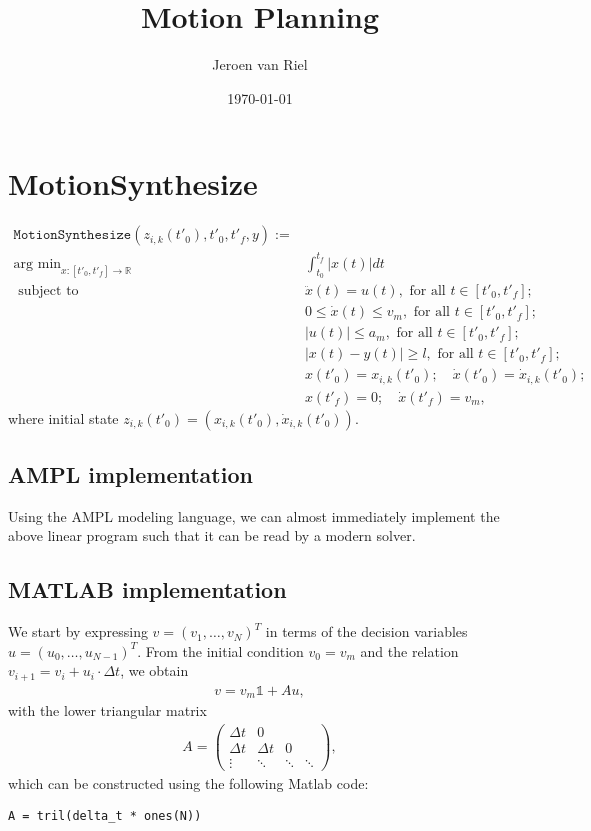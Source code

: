 \documentclass[a4paper]{article}
\author{Jeroen van Riel}
\date{\monthyeardate\today}
\title{Motion Planning}
\theoremstyle{definition}
\theoremstyle{plain}
\begin{document}
\section*{MotionSynthesize}

\begin{align*}
  \texttt{MotionSynthesize}(z_{i,k}(t'_{0}), t'_{0}, t'_{f}, y) := \\
  \text{arg min}_{x : [t'_{0}, t'_{f}] \rightarrow \mathbb{R}} \; &\int_{t_{0}}^{t_{f}} |x(t)|dt \\
  \text{ subject to } \; & \ddot{x}(t) = u(t) , \text{ for all } t \in [t'_{0}, t'_{f}] ; \\
  & 0 \leq \dot{x}(t) \leq v_{m} , \text{ for all } t \in [t'_{0}, t'_{f}] ; \\
  & |u(t)| \leq a_{m} , \text{ for all } t \in [t'_{0}, t'_{f}] ; \\
  & |x(t) - y(t)| \geq l , \text{ for all } t \in [t'_{0}, t'_{f}] ; \\
  & x(t'_{0}) = x_{i,k}(t'_{0}); \quad \dot{x}(t'_{0}) = \dot{x}_{i,k}(t'_{0}) ; \\
  & x(t'_{f}) = 0; \quad \dot{x}(t'_{f}) = v_{m} ,
\end{align*}
%
where initial state $z_{i,k}(t'_{0}) = (x_{i,k}(t'_{0}), \dot{x}_{i,k}(t'_{0}))$.

\subsection*{AMPL implementation}

Using the AMPL modeling language, we can almost immediately implement the above
linear program such that it can be read by a modern solver.


\subsection*{MATLAB implementation}

We start by expressing $v = {(v_{1}, \dots, v_{N})}^{T}$ in terms of the decision variables $u = {(u_{0}, \dots, u_{N-1})}^{T}$.
From the initial condition $v_{0} = v_{m}$ and the relation $v_{i+1} = v_{i} + u_{i} \cdot \Delta t$, we obtain
\begin{align*}
  v = v_{m} \mathds{1} + Au ,
\end{align*}
with the lower triangular matrix
\begin{align*}
  A =
  \begin{pmatrix}
    \Delta t & 0  \\
    \Delta t & \Delta t & 0 &  \\
    \vdots & \ddots & \ddots & \ddots
    \end{pmatrix} ,
\end{align*}
which can be constructed using the following Matlab code:
\begin{lstlisting}[style=Matlab-editor]
  A = tril(delta_t * ones(N))
\end{lstlisting}
\end{document}
